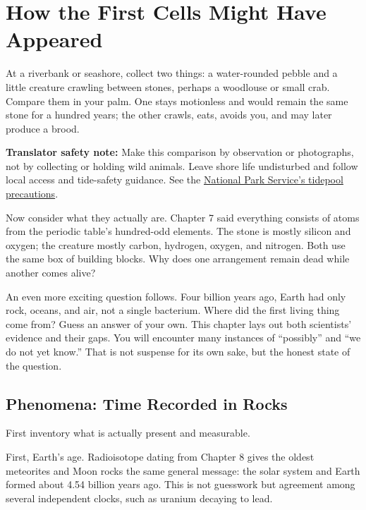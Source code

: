 \chapter{How the First Cells Might Have Appeared}

\begin{kaichang}
At a riverbank or seashore, collect two things: a water-rounded pebble and a little creature crawling between stones, perhaps a woodlouse or small crab. Compare them in your palm. One stays motionless and would remain the same stone for a hundred years; the other crawls, eats, avoids you, and may later produce a brood.

\textbf{Translator safety note:} Make this comparison by observation or photographs, not by collecting or holding wild animals. Leave shore life undisturbed and follow local access and tide-safety guidance. See the \href{https://www.nps.gov/pore/planyourvisit/tidepooling.htm}{National Park Service's tidepool precautions}.

Now consider what they actually are. Chapter 7 said everything consists of atoms from the periodic table's hundred-odd elements. The stone is mostly silicon and oxygen; the creature mostly carbon, hydrogen, oxygen, and nitrogen. Both use the same box of building blocks. Why does one arrangement remain dead while another comes alive?

An even more exciting question follows. Four billion years ago, Earth had only rock, oceans, and air, not a single bacterium. Where did the first living thing come from? Guess an answer of your own. This chapter lays out both scientists' evidence and their gaps. You will encounter many instances of ``possibly'' and ``we do not yet know.'' That is not suspense for its own sake, but the honest state of the question.
\end{kaichang}

\section{Phenomena: Time Recorded in Rocks}

First inventory what is actually present and measurable.

First, Earth's age. Radioisotope dating from Chapter 8 gives the oldest meteorites and Moon rocks the same general message: the solar system and Earth formed about 4.54 billion years ago. This is not guesswork but agreement among several independent clocks, such as uranium decaying to lead.

